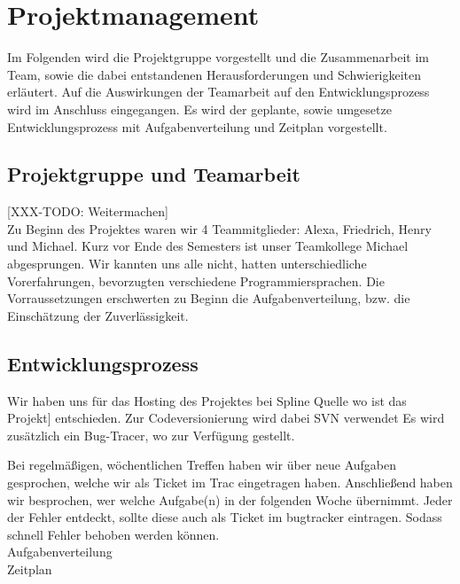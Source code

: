 \section{Projektmanagement}
\label{sec:projektmanagement}

Im Folgenden wird die Projektgruppe vorgestellt und die Zusammenarbeit im Team, sowie die dabei entstandenen Herausforderungen und Schwierigkeiten erläutert. Auf die Auswirkungen der Teamarbeit auf den Entwicklungsprozess wird im Anschluss eingegangen. Es wird der geplante, sowie umgesetze Entwicklungsprozess mit Aufgabenverteilung und Zeitplan vorgestellt.

\subsection{Projektgruppe und Teamarbeit}
\label{subsec:teammitglieder}

[XXX-TODO: Weitermachen]\\
Zu Beginn des Projektes waren wir 4 Teammitglieder: Alexa, Friedrich, Henry und Michael. Kurz vor Ende des Semesters ist unser Teamkollege Michael abgesprungen. Wir kannten uns alle nicht, hatten unterschiedliche Vorerfahrungen, bevorzugten verschiedene Programmiersprachen. Die Vorraussetzungen erschwerten zu Beginn die Aufgabenverteilung, bzw. die Einschätzung der Zuverlässigkeit.


\subsection{Entwicklungsprozess}
\label{subsec:prozess}

Wir haben uns für das Hosting des Projektes bei Spline Quelle wo ist das Projekt{]} entschieden. Zur Codeversionierung wird dabei SVN verwendet Es wird zusätzlich ein Bug-Tracer, wo zur Verfügung gestellt. 

Bei regelmäßigen, wöchentlichen Treffen haben wir über neue Aufgaben gesprochen, welche wir als Ticket im Trac eingetragen haben. Anschließend haben wir besprochen, wer welche Aufgabe(n) in der folgenden Woche übernimmt. Jeder der Fehler entdeckt, sollte diese auch als Ticket im bugtracker eintragen. Sodass schnell Fehler behoben werden können.\\

Aufgabenverteilung\\
Zeitplan\\